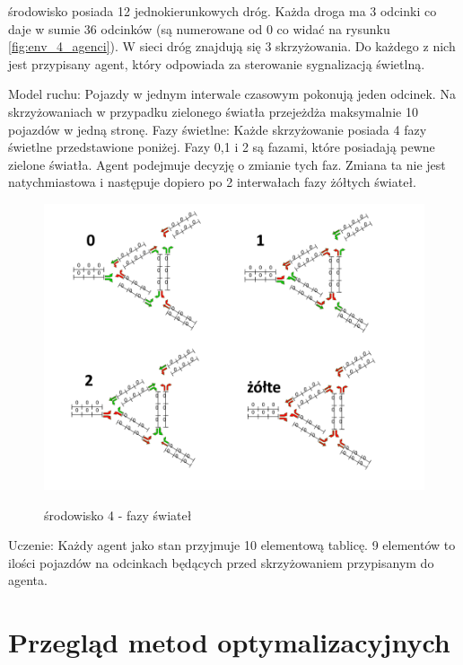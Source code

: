 \documentclass[12pt]{book}
\theoremstyle{plain}
\begin{document}
środowisko posiada 12 jednokierunkowych dróg. Każda droga ma 3 odcinki co daje w sumie 36 odcinków (są numerowane od 0 co widać na rysunku \ref{fig:env_4_agenci}).
W sieci dróg znajdują się 3 skrzyżowania. Do każdego z nich jest przypisany agent, który odpowiada za sterowanie sygnalizacją świetlną.

Model ruchu:
Pojazdy w jednym interwale czasowym pokonują jeden odcinek. Na skrzyżowaniach w przypadku zielonego światła przejeżdża maksymalnie 10 pojazdów w jedną stronę.
Fazy świetlne: Każde skrzyżowanie posiada 4 fazy świetlne przedstawione poniżej. Fazy 0,1 i 2 są fazami, które posiadają pewne zielone światła. Agent podejmuje decyzję o zmianie tych faz. Zmiana ta nie jest natychmiastowa i następuje dopiero po 2 interwałach fazy żółtych 
świateł.

\begin{figure}[H]
	\centering
	\includegraphics[width=14cm]{env_4_fazy}
	\label{fig:env_4_fazy}
	\caption{środowisko 4 - fazy świateł}
\end{figure}


Uczenie:
Każdy agent jako stan przyjmuje 10 elementową tablicę. 9 elementów to ilości pojazdów na odcinkach będących przed skrzyżowaniem przypisanym do agenta.
\chapter{Przegląd metod optymalizacyjnych}
\end{document}
